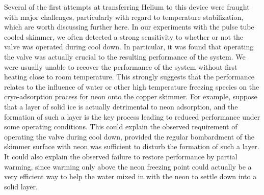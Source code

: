 Several of the first attempts at transferring Helium to this device were fraught with major challenges, particularly with regard to temperature stabilization, which are worth discussing further here.
In our experiments with the pulse tube cooled skimmer, we often detected a strong sensitivity to whether or not the valve was operated during cool down.
In particular, it was found that operating the valve was actually crucial to the resulting performance of the system.
We were usually unable to recover the performance of the system without first heating close to room temperature.
This strongly suggests that the performance relates to the influence of water or other high temperature freezing species on the cryo-adsorption process for neon onto the copper skimmer.
For example, suppose that a layer of solid ice is actually detrimental to neon adsorption, and the formation of such a layer is the key process leading to reduced performance under some operating conditions.
This could explain the observed requirement of operating the valve during cool down, provided the regular bombardment of the skimmer surface with neon was sufficient to disturb the formation of such a layer.
It could also explain the observed failure to restore performance by partial warming, since warming only above the neon freezing point could actually be a very efficient way to help the water mixed in with the neon to settle down into a solid layer.


